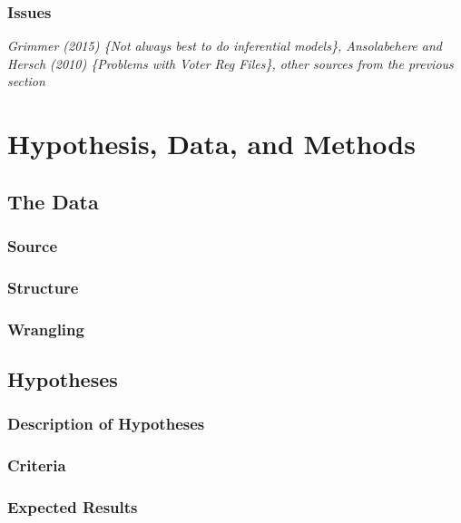 \documentclass[12pt,twoside]{reedthesis}
\begin{document}
  \subsection{Issues}\label{issues}
  
  \emph{Grimmer (2015) \{Not always best to do inferential models\},
  Ansolabehere and Hersch (2010) \{Problems with Voter Reg Files\}, other
  sources from the previous section}
  
  \chapter{Hypothesis, Data, and
  Methods}\label{hypothesis-data-and-methods}
  
  \section{The Data}\label{the-data}
  
  \subsection{Source}\label{source}
  
  \subsection{Structure}\label{structure}
  
  \subsection{Wrangling}\label{wrangling}
  
  \section{Hypotheses}\label{hypotheses}
  
  \subsection{Description of Hypotheses}\label{description-of-hypotheses}
  
  \subsection{Criteria}\label{criteria}
  
  \subsection{Expected Results}\label{expected-results}
  
\end{document}

